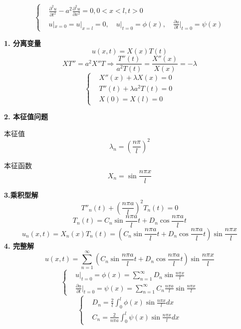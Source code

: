 \begin{ex}
    $$\left\{\begin{aligned}
        &\frac{\partial^2{u}}{\partial{t}^2}-a^2\frac{\partial^2{u}}{\partial{x}^2}=0,0<x<l,t>0\\
        &u|_{x=0}=u|_{x=l}=0,\quad u|_{t=0}=\phi(x),\quad\frac{\partial u}{\partial t}\bigg|_{t=0}=\psi(x)
    \end{aligned}\right.$$

   \noindent\textbf{1. 分离变量}
            $$u(x,t)=X(x)T(t)$$
            $$XT''=a^2X''T\Rightarrow\frac{T''(t)}{a^2 T(t)}=\frac{X''(x)}{X(x)}=-\lambda$$
            $$\left\{
        \begin{aligned}
        &X''(x)+\lambda X(x)=0\\
        &T''(t)+\lambda a^2T(t)=0\\
        &X(0)=X(l)=0
                \end{aligned}
        \right.$$
    
    \noindent\textbf{2. 本征值问题}
    
            本征值$$\lambda_n=\left(\frac{n\pi}{l}\right)^2$$

            本征函数$$X_n=\sin\frac{n\pi x}{l}$$

    \noindent\textbf{3.乘积型解}
            $$T''_n(t)+\left(\frac{n\pi a}{l}\right)^2T_n(t)=0$$
            $$T_n(t)=C_n\sin\frac{n\pi a}{l}t+D_n\cos\frac{n\pi a}{l}t$$
            $$u_n(x,t)=X_n(x)T_n(t)=\left(C_n\sin\frac{n\pi a}{l}t+D_n\cos\frac{n\pi a}{l}t\right)\sin\frac{n\pi x}{l}$$
    \noindent\textbf{4. 完整解}
        $$u(x,t)=\sum^\infty_{n=1}\left(C_n\sin\frac{n\pi a}{l}t+D_n\cos\frac{n\pi a}{l}t\right)\sin\frac{n\pi x}{l}$$
          $$\left\{
        \begin{aligned}
        &u|_{t=0}=\phi(x)=\sum_{n=1}^\infty D_n\sin\frac{n\pi x}{l}\\
        &\frac{\partial u}{\partial t}\bigg|_{t=0}=\psi(x)=\sum_{n=1}^\infty C_n\frac{n\pi a}{l}\sin\frac{n\pi x}{l}
                \end{aligned}
        \right.$$
        $$\left\{
        \begin{aligned}
        &D_n=\frac{2}{l}\int_0^l\phi(x)\sin\frac{n\pi x}{l}dx\\
        &C_n=\frac{2}{n\pi a}\int_0^l\psi(x)\sin\frac{n\pi x}{l}dx
                \end{aligned}
        \right.$$
\end{ex}


